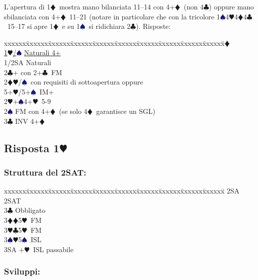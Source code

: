 \documentclass[a4paper,italian]{article}
\newcommand{\BC}{\textcolor{OliveGreen}{$\clubsuit$}}
\newcommand{\BD}{\textcolor{RedOrange}{$\vardiamondsuit$}}
\newcommand{\BH}{\textcolor{Red2}{$\varheartsuit${}}}
\newcommand{\BS}{\textcolor{MidnightBlue}{$\spadesuit${}}}
\newcommand{\pdfh}{\texorpdfstring{\BH{}}{H}}
\newenvironment{bidtable}
{\begin{tabbing}

    xxxxxx\=xxxxxx\=xxxxxx\=xxxxxx\=xxxxxx\=xxxxxx\=xxxxxx\=xxxxxx\=xxxxxx\=xxxxxx\=\kill}
{\end{tabbing} }%
\begin{document}
\begin{multicols}{2}
    L'apertura di 1\BD\ mostra mano bilanciata 11--14 con 4+\BD\ (non 4\BC ) oppure mano sbilanciata con 4+\BD\ 11--21 (notare in particolare che con la tricolore 1\BS 4\BH 4\BD 4\BC\ 15--17  si apre 1\BD\ e su 1\BS\ si ridichiara 2\BC ).
    Risposte:
    \begin{bidtable}
        1\BD\+\\
        \hyperref[fissaggi]{1\BH/\BS} \> \hyperref[fissaggi]{Naturali 4+}\\
        1/2SA \> Naturali\\
        2\BC {}+ con 2+\BC\ FM\\
        2\BD {}\BH /\BS\ con requisiti di sottoapertura oppure\+\\5+\BH /5+\BS\ IM+\-\\
        2\BH {}+\BS 4+\BH\ 5-9\\
        2\BS \> FM con 4+\BD\ (se solo 4\BD\ garantisce un SGL)\\
        3\BC \> INV 4+\BD \-
    \end{bidtable}
    \bigbreak

    \subsection{Risposta 1\pdfh}

    \subsubsection{Struttura del 2SAT:}

    \begin{bidtable}
        2SA \> 2SAT\+\\
        3\BC \> Obbligato\+\\
        3\BD {}\BD 5\BH\ FM\\
        3\BH {}\BC 5\BH\ FM\\
        3\BS {}\BH 5\BS\ ISL\\
        3SA +\BH\ ISL passabile\-\-
    \end{bidtable}

    \subsubsection{Sviluppi:}


\end{multicols}
\end{document}

